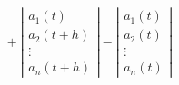 \documentclass[10pt,usepdftitle=false,hyperref={unicode}]{beamer}
\newcommand{\absolute}[1]{\left|#1\right|}
\newcommand{\parentheses}[1]{\left(#1\right)}
\begin{document}
\begin{frame}
\begin{align*}
{{        }
        +
        \absolute{%
            \begin{array}{c}
                a_1\parentheses{t} \\
                a_2\parentheses{t + h} \\
                \vdots \\
                a_n\parentheses{t + h}
            \end{array}
        }
        -
        \absolute{%
            \begin{array}{c}
                a_1\parentheses{t} \\
                a_2\parentheses{t} \\
                \vdots \\
                a_n\parentheses{t}
            \end{array}
        }
    }
\end{align*}
\end{frame}
\end{document}
